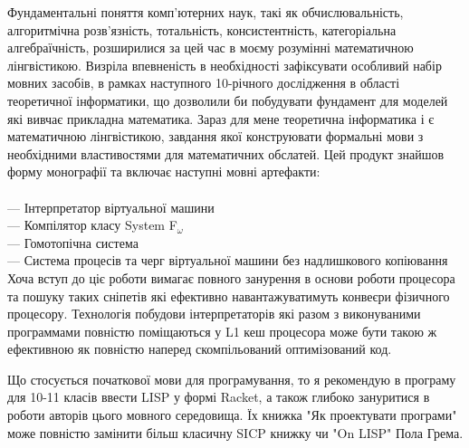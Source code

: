 Фундаментальні поняття комп'ютерних наук, такі як обчислювальність,
алгоритмічна розв'язність, тотальність, консистентність,
категоріальна алгебраїчність, розширилися за цей час в моєму
розумінні математичною лінгвістикою. Визріла впевненість в
необхідності зафіксувати особливий набір мовних засобів, в
рамках наступного 10-річного дослідження в області теоретичної
інформатики, що дозволили би побудувати фундамент для моделей
які вивчає прикладна математика. Зараз для мене теоретична
інформатика і є математичною лінгвістикою, завдання якої
конструювати формальні мови з необхідними властивостями для
математичних обслатей. Цей продукт знайшов форму монографії
та включає наступні мовні артефакти:
\\
\\
\noindent--- Інтерпретатор віртуальної машини\\
--- Компілятор класу System F$_\omega$\\
--- Гомотопічна система\\
--- Система процесів та черг віртуальної машини без надлишкового копіювання\\

Хоча вступ до ціє роботи вимагає повного занурення в основи
роботи процесора та пошуку таких сніпетів які ефективно
навантажуватимуть конвеєри фізичного процесору. Технологія
побудови інтерпретаторів які разом з виконуваними программами
повністю поміщаються у L1 кеш процесора може бути такою ж
ефективною як повністю наперед скомпільований оптимізований код.

Що стосується початкової мови для програмування, то я рекомендую
в програму для 10-11 класів ввести LISP у формі Racket, а також
глибоко зануритися в роботи авторів цього мовного середовища.
Їх книжка "Як проектувати програми" може повністю замінити
більш класичну SICP книжку чи "On LISP" Пола Грема.



